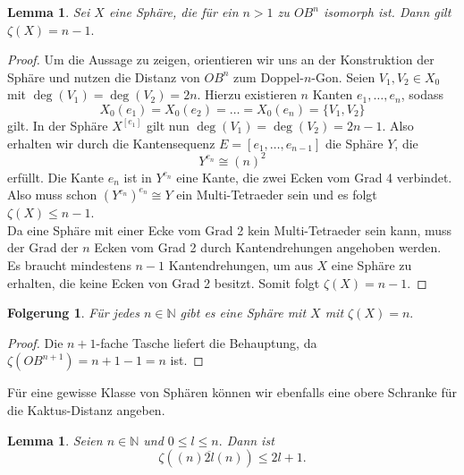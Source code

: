 \documentclass[12pt,titlepage,twoside,cleardoublepage]{article}
\theoremstyle{nummermitklammern}
\newtheorem{lemma}[temp]{Lemma}
\newtheorem{folgerung}[temp]{Folgerung}
\newtheorem{lemma}[zahl]{Lemma}
\newtheorem{folgerung}[zahl]{Folgerung}
\numberwithin{equation}{section}
\begin{document}
\begin{lemma}
Sei $X$ eine Sphäre, die für ein $n>1$ zu $OB^n$ isomorph ist. Dann gilt $\zeta(X)=n-1.$
\end{lemma}
\begin{proof}
Um die Aussage zu zeigen, orientieren wir uns an der Konstruktion der Sphäre und nutzen die Distanz von $OB^n$ zum Doppel-$n$-Gon. Seien $V_1,V_2\in X_0$ mit $\deg(V_1)=\deg(V_2)=2n$. Hierzu existieren $n$ Kanten $e_1,\ldots,e_n$, sodass 
\[
X_0(e_1)=X_0(e_2)=\ldots=X_0(e_n)=\{V_1,V_2\}
\] gilt.
In der Sphäre $X^{[e_1]}$ gilt nun $\deg(V_1)=\deg(V_2)=2n-1$. Also erhalten wir durch die Kantensequenz $E=[e_1,\ldots,e_{n-1}]$ die Sphäre $Y$, die 
\[
Y^{e_n}\cong (n)^2
\] erfüllt. Die Kante $e_n$ ist in $Y^{e_n}$ eine Kante, die zwei Ecken vom Grad 4 verbindet. Also muss schon ${(Y^{e_n})}^{e_n}\cong Y$ ein Multi-Tetraeder sein und
 es folgt $\zeta(X)\leq n-1$. \\
Da eine Sphäre mit einer Ecke vom Grad 2 kein Multi-Tetraeder sein kann, muss der Grad der $n$ Ecken vom Grad 2 durch Kantendrehungen angehoben werden. Es braucht mindestens $n-1$ Kantendrehungen, um aus $X$ eine Sphäre zu erhalten, die keine Ecken von Grad 2 besitzt. Somit folgt $\zeta(X)=n-1.$
\end{proof}
\begin{folgerung}
Für jedes $n \in \mathbb{N}$ gibt es eine Sphäre mit $X$ mit $\zeta(X)=n.$
\end{folgerung}
\begin{proof}
Die $n+1$-fache Tasche liefert die Behauptung, da $\zeta(OB^{n+1})=n+1-1=n$ ist.
\end{proof}
Für eine gewisse Klasse von Sphären können wir ebenfalls eine obere Schranke für die Kaktus-Distanz angeben.
\begin{lemma}
Seien $n\in \mathbb{N}$ und $0\leq l \leq n.$ Dann ist 
\[
\zeta((n)\overline{2l}(n))\leq 2l+1.
\]
\end{lemma}
\end{document}
